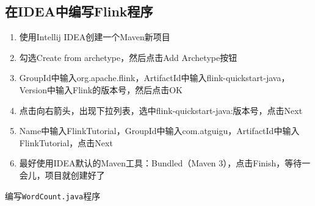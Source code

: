 \documentclass[cn,11pt,chinese]{elegantbook}
\providecommand{\tightlist}{%
  \setlength{\itemsep}{0pt}\setlength{\parskip}{0pt}}
\begin{document}
\hypertarget{ux5728ideaux4e2dux7f16ux5199flinkux7a0bux5e8f}{%
\subsection{在IDEA中编写Flink程序}\label{ux5728ideaux4e2dux7f16ux5199flinkux7a0bux5e8f}}

\begin{enumerate}
\def\labelenumi{\arabic{enumi}.}
\tightlist
\item
  使用Intellij IDEA创建一个Maven新项目
\item
  勾选Create from archetype，然后点击Add Archetype按钮
\item
  GroupId中输入org.apache.flink，ArtifactId中输入flink-quickstart-java，Version中输入Flink的版本号，然后点击OK
\item
  点击向右箭头，出现下拉列表，选中flink-quickstart-java:版本号，点击Next
\item
  Name中输入FlinkTutorial，GroupId中输入com.atguigu，ArtifactId中输入FlinkTutorial，点击Next
\item
  最好使用IDEA默认的Maven工具：Bundled（Maven
  3），点击Finish，等待一会儿，项目就创建好了
\end{enumerate}

编写\texttt{WordCount.java}程序
\end{document}
